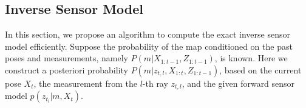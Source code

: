 \documentclass[smallextended]{svjour3}       %
\begin{document}




	


%
%
%
%


\subsection{Inverse Sensor Model}



In this section, we propose an algorithm to compute the exact inverse sensor model efficiently. 
Suppose the probability of the map conditioned on the past poses and measurements, namely $P(m|X_{1:t-1},Z_{1:t-1})$, is known. Here we construct a posteriori probability $P(m|z_{t,l},X_{1:t},Z_{1:t-1})$, based on the current pose $X_t$, the measurement from the $l$-th ray $z_{t,l}$, and the given forward sensor model $p(z_{t_l}|m,X_t)$.
\end{document}
